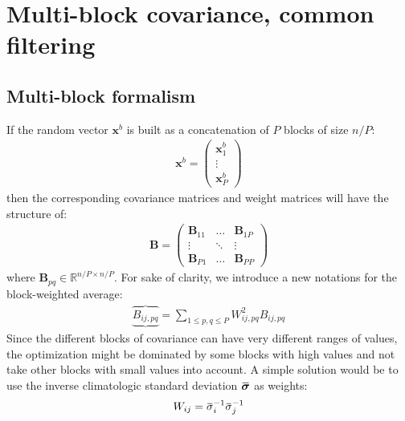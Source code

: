 \documentclass[12pt]{scrartcl}
\newcommand{\overbar}[1]{\mkern 1.5mu\overline{\mkern-1.5mu#1\mkern-1.5mu}\mkern 1.5mu}
\begin{document}
\clearpage

\section{Multi-block covariance, common filtering}
\label{sec:multiblock}

\subsection{Multi-block formalism}
If the random vector $\mathbf{x}^b$ is built as a concatenation of $P$ blocks of size $n/P$:
\begin{align}
\mathbf{x}^b = \left( \begin{array}{c}
\mathbf{x}^b_1 \\
\vdots \\
\mathbf{x}^b_P
\end{array} \right)
\end{align}
then the corresponding covariance matrices and weight matrices will have the structure of:
\begin{align}
\mathbf{B} = \left( \begin{array}{ccc}
\mathbf{B}_{11} & \dots & \mathbf{B}_{1P} \\
\vdots & \ddots & \vdots \\
\mathbf{B}_{P1} & \dots & \mathbf{B}_{PP}
\end{array} \right)
\end{align}
where $\mathbf{B}_{pq} \in \mathbb{R}^{n/P \times n/P}$. For sake of clarity, we introduce a new notations for the block-weighted average:
\begin{align}
\underbrace{\overbrace{B_{ij,pq}}} = \sum_{1 \le p,q \le P} W_{ij,pq}^2 B_{ij,pq}
\end{align}
Since the different blocks of covariance can have very different ranges of values, the optimization might be dominated by some blocks with high values and not take other blocks with small values into account. A simple solution would be to use the inverse climatologic standard deviation $\overbar{\boldsymbol{\sigma}}$ as weights:
\begin{align}
W_{ij} = \overbar{\sigma}_i^{-1} \overbar{\sigma}_j^{-1}
\end{align}
\end{document}
